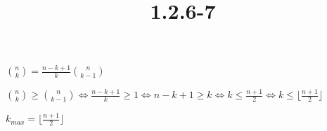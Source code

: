\documentclass{article}
\title{1.2.6-7}
\begin{document}
\maketitle

\( \binom{n}{k} = \frac{n-k+1}{k} \binom{n}{k-1} \)

\( \binom{n}{k} \geq \binom{n}{k-1} \iff \frac{n-k+1}{k} \geq 1 \iff n - k + 1 \geq k \iff k \leq \frac{n+1}{2} \iff k \leq \lfloor\frac{n+1}{2}\rfloor \)

\( k_{max} = \lfloor\frac{n+1}{2}\rfloor \)
\end{document}
